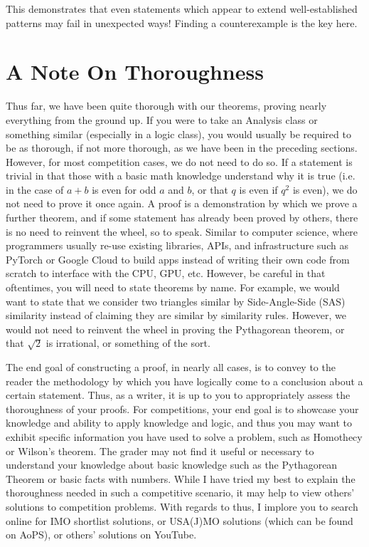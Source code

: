 This demonstrates that even statements which appear to extend well-established patterns may fail in unexpected ways! Finding a counterexample is the key here. 


\section{A Note On Thoroughness}
Thus far, we have been quite thorough with our theorems, proving nearly everything from the ground up. If you were to take an Analysis class or something similar (especially in a logic class), you would usually be required to be as thorough, if not more thorough, as we have been in the preceding sections. However, for most competition cases, we do not need to do so. If a statement is trivial in that those with a basic math knowledge understand why it is true (i.e. in the case of $a + b$ is even for odd $a$ and $b$, or that $q$ is even if $q^2$ is even), we do not need to prove it once again. A proof is a demonstration by which we prove a further theorem, and if some statement has already been proved by others, there is no need to reinvent the wheel, so to speak. Similar to computer science, where programmers usually re-use existing libraries, APIs, and infrastructure such as PyTorch or Google Cloud to build apps instead of writing their own code from scratch to interface with the CPU, GPU, etc. However, be careful in that oftentimes, you will need to state theorems by name. For example, we would want to state that we consider two triangles similar by Side-Angle-Side (SAS) similarity instead of claiming they are similar by similarity rules. However, we would not need to reinvent the wheel in proving the Pythagorean theorem, or that $\sqrt{2}$ is irrational, or something of the sort. 

The end goal of constructing a proof, in nearly all cases, is to convey to the reader the methodology by which you have logically come to a conclusion about a certain statement. Thus, as a writer, it is up to you to appropriately assess the thoroughness of your proofs. For competitions, your end goal is to showcase your knowledge and ability to apply knowledge and logic, and thus you may want to exhibit specific information you have used to solve a problem, such as Homothecy or Wilson's theorem. The grader may not find it useful or necessary to understand your knowledge about basic knowledge such as the Pythagorean Theorem or basic facts with numbers. While I have tried my best to explain the thoroughness needed in such a competitive scenario, it may help to view others' solutions to competition problems. With regards to thus, I implore you to search online for IMO shortlist solutions, or USA(J)MO solutions (which can be found on AoPS), or others' solutions on YouTube. 

